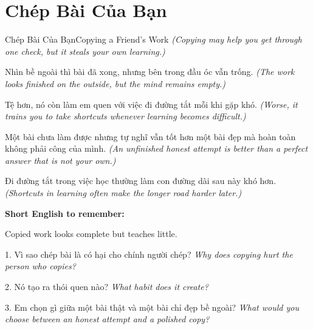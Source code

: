\section{Chép Bài Của Bạn}
\begin{truyen}{Chép Bài Của Bạn}{Copying a Friend's Work}
\textit{(Copying may help you get through one check, but it steals your own learning.)}

Nhìn bề ngoài thì bài đã xong, nhưng bên trong đầu óc vẫn trống.
\textit{(The work looks finished on the outside, but the mind remains empty.)}

Tệ hơn, nó còn làm em quen với việc đi đường tắt mỗi khi gặp khó.
\textit{(Worse, it trains you to take shortcuts whenever learning becomes difficult.)}

Một bài chưa làm được nhưng tự nghĩ vẫn tốt hơn một bài đẹp mà hoàn toàn không phải công của mình.
\textit{(An unfinished honest attempt is better than a perfect answer that is not your own.)}
\end{truyen}

\begin{baihoc}
Đi đường tắt trong việc học thường làm con đường dài sau này khó hơn.
\textit{(Shortcuts in learning often make the longer road harder later.)}
\end{baihoc}

\begin{ghinhoanh}
\textbf{Short English to remember:}

Copied work looks complete but teaches little.

\end{ghinhoanh}

\begin{tuhocnhanh}
1. Vì sao chép bài là có hại cho chính người chép? \textit{Why does copying hurt the person who copies?}

2. Nó tạo ra thói quen nào? \textit{What habit does it create?}

3. Em chọn gì giữa một bài thật và một bài chỉ đẹp bề ngoài? \textit{What would you choose between an honest attempt and a polished copy?}
\end{tuhocnhanh}
\ngancach

